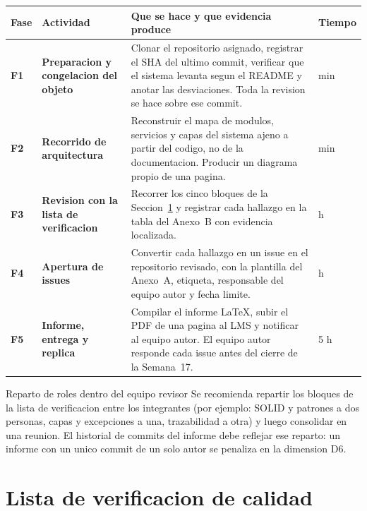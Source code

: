 \documentclass[11pt,a4paper]{article}
\begin{document}
\noindent
\begin{tabularx}{\linewidth}{@{}>{\bfseries}p{1.1cm} >{\RaggedRight\bfseries}p{3.4cm} X >{\centering\arraybackslash}p{1.5cm}@{}}
    \toprule
    \rowcolor{uteqSoft}\textbf{\color{uteqBlue}Fase} & \textbf{\color{uteqBlue}Actividad} & \textbf{\color{uteqBlue}Que se hace y que evidencia produce} & \textbf{\color{uteqBlue}Tiempo} \\
    \midrule
    F1 & Preparacion y congelacion del objeto & Clonar el repositorio asignado, registrar el SHA del ultimo commit, verificar que el sistema levanta segun el README y anotar las desviaciones. Toda la revision se hace sobre ese commit. & 45 min \\
    F2 & Recorrido de arquitectura & Reconstruir el mapa de modulos, servicios y capas del sistema ajeno a partir del codigo, no de la documentacion. Producir un diagrama propio de una pagina. & 45 min \\
    F3 & Revision con la lista de verificacion & Recorrer los cinco bloques de la Seccion~\ref{sec:checklist} y registrar cada hallazgo en la tabla del Anexo~B con evidencia localizada. & 2 h \\
    F4 & Apertura de issues & Convertir cada hallazgo en un issue en el repositorio revisado, con la plantilla del Anexo~A, etiqueta, responsable del equipo autor y fecha limite. & 1 h \\
    F5 & Informe, entrega y replica & Compilar el informe LaTeX, subir el PDF de una pagina al LMS y notificar al equipo autor. El equipo autor responde cada issue antes del cierre de la Semana~17. & 1{,}5 h \\
    \bottomrule
\end{tabularx}

\vspace{6pt}

\begin{avisoBox}{Reparto de roles dentro del equipo revisor}
    Se recomienda repartir los bloques de la lista de verificacion entre los integrantes (por ejemplo: SOLID y patrones a dos personas, capas y excepciones a una, trazabilidad a otra) y luego consolidar en una reunion. El historial de commits del informe debe reflejar ese reparto: un informe con un unico commit de un solo autor se penaliza en la dimension D6.
\end{avisoBox}

\section{Lista de verificacion de calidad}
\label{sec:checklist}
\end{document}
